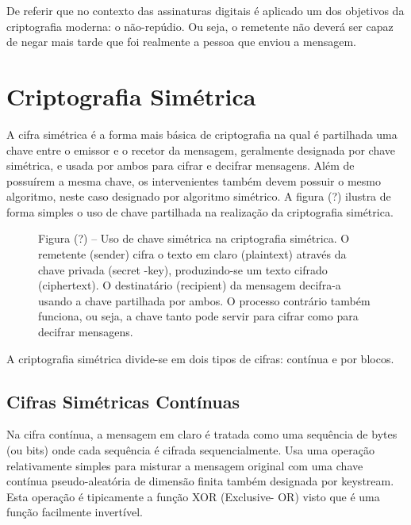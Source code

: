 \documentclass[a4paper,11pt,openright,oneside]{report}
\begin{document}
De referir que no contexto das assinaturas digitais é aplicado um dos objetivos da criptografia moderna: o não-repúdio. Ou seja, o remetente não deverá ser capaz de negar mais tarde que foi realmente a pessoa que enviou a mensagem.

\section{Criptografia Simétrica}
\label{chalp.simétrica}

A cifra simétrica é a forma mais básica de criptografia na qual é partilhada uma chave entre o emissor e o recetor da mensagem, geralmente designada por chave simétrica, e usada por ambos para cifrar e decifrar mensagens. Além de possuírem a mesma chave, os intervenientes também devem possuir o mesmo algoritmo, neste caso designado por algoritmo simétrico. A figura (?) ilustra de forma simples o uso de chave partilhada na realização da criptografia simétrica.

\begin{figure}[ht]
\center
{}
\caption{Figura (?) – Uso de chave simétrica na criptografia simétrica. O remetente (sender) cifra o texto em claro (plaintext) através da chave privada (secret -key), produzindo-se um texto cifrado (ciphertext). O destinatário (recipient) da mensagem decifra-a usando a chave partilhada por ambos. O processo contrário também funciona, ou seja, a chave tanto pode servir para cifrar como para decifrar mensagens.}
\label{fig:crypto1}
\end{figure}

A criptografia simétrica divide-se em dois tipos de cifras: contínua e por blocos.

\subsection{Cifras Simétricas Contínuas}

Na cifra contínua, a mensagem em claro é tratada como uma sequência de bytes (ou bits) onde cada sequência é cifrada sequencialmente. Usa uma operação relativamente simples para misturar a mensagem original com uma chave contínua pseudo-aleatória de dimensão finita também designada por keystream. Esta operação é tipicamente a função XOR (Exclusive- OR) visto que é uma função facilmente invertível.\\
\end{document}
